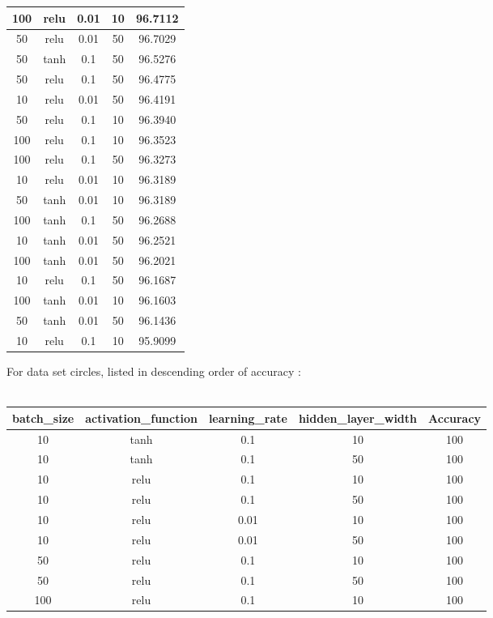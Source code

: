 \begin{itemize}
\begin{tabular}{ | c | c | c | c | c |  }
		100 & relu & 0.01 & 10 & 96.7112  \\ \hline
		50 & relu & 0.01 & 50 & 96.7029  \\ \hline
		50 & tanh & 0.1 & 50 & 96.5276  \\ \hline
		50 & relu & 0.1 & 50 & 96.4775  \\ \hline
		10 & relu & 0.01 & 50 & 96.4191  \\ \hline
		50 & relu & 0.1 & 10 & 96.3940  \\ \hline
		100 & relu & 0.1 & 10 & 96.3523  \\ \hline
		100 & relu & 0.1 & 50 & 96.3273  \\ \hline
		10 & relu & 0.01 & 10 & 96.3189  \\ \hline
		50 & tanh & 0.01 & 10 & 96.3189  \\ \hline
		100 & tanh & 0.1 & 50 & 96.2688  \\ \hline
		10 & tanh & 0.01 & 50 & 96.2521  \\ \hline
		100 & tanh & 0.01 & 50 & 96.2021  \\ \hline
		10 & relu & 0.1 & 50 & 96.1687  \\ \hline
		100 & tanh & 0.01 & 10 & 96.1603  \\ \hline
		50 & tanh & 0.01 & 50 & 96.1436  \\ \hline
		10 & relu & 0.1 & 10 & 95.9099  \\ \hline
	\end{tabular}
	\clearpage
	For data set circles, listed in descending order of accuracy : \\\\
	\begin{tabular}{ | c | c | c | c | c | }
	\hline
		batch\_size & activation\_function & learning\_rate & hidden\_layer\_width & Accuracy \\ \hline
		10 & tanh & 0.1 & 10 & 100 \\ \hline
		10 & tanh & 0.1 & 50 & 100 \\ \hline
		10 & relu & 0.1 & 10 & 100 \\ \hline
		10 & relu & 0.1 & 50 & 100 \\ \hline
		10 & relu & 0.01 & 10 & 100 \\ \hline
		10 & relu & 0.01 & 50 & 100 \\ \hline
		50 & relu & 0.1 & 10 & 100 \\ \hline
		50 & relu & 0.1 & 50 & 100 \\ \hline
		100 & relu & 0.1 & 10 & 100 \\ \hline

\end{tabular}
\end{itemize}
